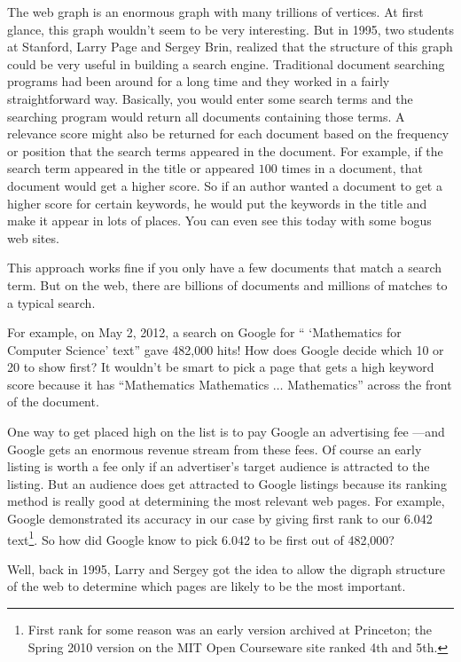 The web graph is an enormous graph with many trillions of vertices.
At first glance, this graph wouldn't seem to be very interesting.  But
in 1995, two students at Stanford,  Larry Page and
 Sergey Brin, realized that the structure of this
graph could be very useful in building a search engine.  Traditional
document searching programs had been around for a long time and they
worked in a fairly straightforward way.  Basically, you would enter
some search terms and the searching program would return all documents
containing those terms.  A relevance score might also be returned for
each document based on the frequency or position that the search terms
appeared in the document.  For example, if the search term appeared in
the title or appeared $100$ times in a document, that document would
get a higher score.  So if an author wanted a document to get a higher
score for certain keywords, he would put the keywords in the title and
make it appear in lots of places.  You can even see this today with
some bogus web sites.

This approach works fine if you only have a few documents that match a
search term.  But on the web, there are billions of documents and millions
of matches to a typical search.

For example, on May 2, 2012, a search on Google for `` `Mathematics
for Computer Science' text'' gave 482,000 hits!  How does Google
decide which 10 or 20 to show first?  It wouldn't be smart to pick a
page that gets a high keyword score because it has ``Mathematics
Mathematics $\dots$ Mathematics'' across the front of the document.

One way to get placed high on the list is to pay Google an advertising
fee ---and Google gets an enormous revenue stream from these fees.
Of course an early listing is worth a fee only if an advertiser's
target audience is attracted to the listing.  But an audience does get
attracted to Google listings because its ranking method is really good
at determining the most relevant web pages.  For example, Google
demonstrated its accuracy in our case by giving first rank to our
6.042 text\footnote{First rank for some reason was an early version
  archived at Princeton; the Spring 2010 version on the MIT Open
  Courseware site ranked 4th and 5th.}.  So how did
Google know to pick 6.042 to be first out of 482,000?

Well, back in 1995, Larry and Sergey got the idea to allow the digraph
structure of the web to determine which pages are likely to be the most
important.

